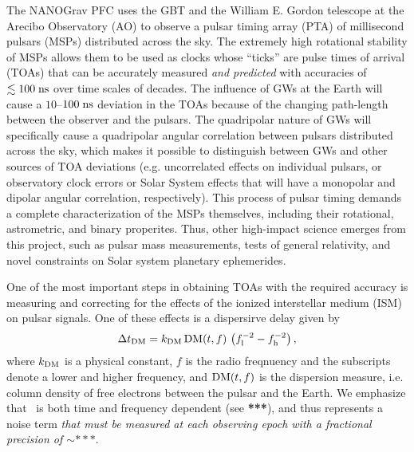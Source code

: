 \documentclass[10pt]{myNSF}
\begin{document}
The NANOGrav PFC uses the GBT and the William E. Gordon telescope at
the Arecibo Observatory (AO) to observe a pulsar timing array (PTA) of
millisecond pulsars (MSPs) distributed across the sky.  The extremely
high rotational stability of MSPs allows them to be used as clocks
whose ``ticks'' are pulse times of arrival (TOAs) that can be
accurately measured \emph{and predicted} with accuracies of $\lesssim
100\; \textrm{ns}$ over time scales of decades.  The influence of GWs at the
Earth will cause a $10$--$100\; \textrm{ns}$ deviation in the TOAs because of
the changing path-length between the observer and the pulsars.  The
quadripolar nature of GWs will specifically cause a quadripolar
angular correlation between pulsars distributed across the sky, which
makes it possible to distinguish between GWs and other sources of TOA
deviations (e.g. uncorrelated effects on individual pulsars, or
observatory clock errors or Solar System effects that will have a
monopolar and dipolar angular correlation, respectively).  This
process of pulsar timing demands a complete characterization of the
MSPs themselves, including their rotational, astrometric, and binary
properites.  Thus, other high-impact science emerges from this
project, such as pulsar mass measurements, tests of general
relativity, and novel constraints on Solar system planetary
ephemerides.

One of the most important steps in obtaining TOAs with the required
accuracy is measuring and correcting for the effects of the ionized
interstellar medium (ISM) on pulsar signals.  One of these effects is
a dispersirve delay given by
\begin{equation}
  \Delta t_{\rm DM} = k_{\rm DM} \, \textrm{DM}(t,f)\, \left( f_{\rm l}^{-2} -
  f_{\rm h}^{-2} \right) ,
\end{equation}
where $k_{\rm DM}$ is a physical constant, $f$ is the radio freqnuency
and the subscripts denote a lower and higher frequency, and $\textrm{DM}(t,f)$
is the dispersion measure, i.e. column density of free electrons
between the pulsar and the Earth.  We emphasize that \DM\ is both time
and frequency dependent (see \textbf{***}), and thus represents a
noise term \emph{that must be measured at each observing epoch with a
  fractional precision of $\sim ***$}.
\end{document}
